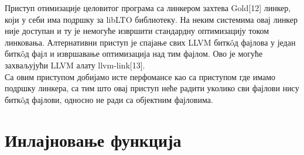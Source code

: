 \documentclass[12pt,oneside]{memoir}
\begin{document}
Приступ отимизације целовитог програма са линкером захтева Gold[12] линкер,
који у себи има подршку за libLTO библиотеку.
На неким системима овај линкер није доступан и ту је немогуће извршити стандардну
оптимизацију током линковања.
Алтернативни приступ је спајање свих LLVM битк\^{o}д фајлова у један битк\^{o}д фајл
и извршавање оптимизација над тим фајлом.
Ово је могуће захваљујући LLVM алату llvm-link[13].
\\
Са овим приступом добијамо исте перфомансе као са приступом где имамо подршку линкера,
са тим што овај приступ неће радити уколико сви фајлови нису  битк\^{o}д фајлови,
односно не ради са објектним фајловима.


\section{Инлајновање функција}
\end{document}
